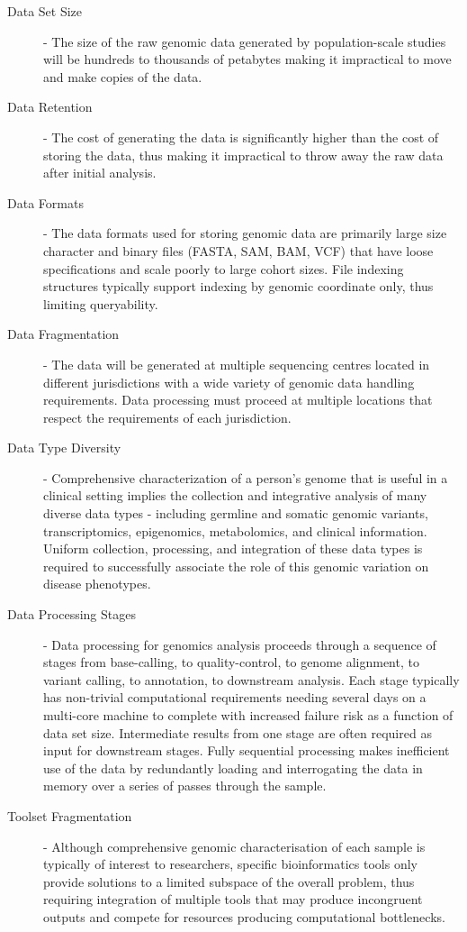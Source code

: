 \begin{description}
\item [Data Set Size] - The size of the raw genomic data generated by population-scale studies will be hundreds to thousands of petabytes making it impractical to move and make copies of the data\autocite{stephens2015big}.
\item [Data Retention] - The cost of generating the data is significantly higher than the cost of storing the data, thus making it impractical to throw away the raw data after initial analysis\autocite{muir2016real}.
\item [Data Formats] - The data formats used for storing genomic data are primarily large size character and binary files (FASTA, SAM, BAM, VCF)\autocite{li2009sequence,danecek2011variant} that have loose specifications and  scale poorly to large cohort sizes. File indexing structures typically support indexing by genomic coordinate only, thus limiting queryability. 
\item [Data Fragmentation] - The data will be generated at multiple sequencing centres located in different jurisdictions with a wide variety of genomic data handling requirements. Data processing must proceed at multiple locations that respect the requirements of each jurisdiction\autocite{molnar2017computing}.
\item [Data Type Diversity] - Comprehensive characterization of a person's genome that is useful in a clinical setting implies the collection and integrative analysis of many diverse data types - including germline\autocite{malkin1990germ} and somatic\autocite{greenman2007patterns} genomic variants, transcriptomics\autocite{wang2009rna}, epigenomics\autocite{jones2007epigenomics}, metabolomics\autocite{vermeersch2013applications}, and clinical information. Uniform collection, processing, and integration of these data types is required to successfully associate the role of this genomic variation on disease phenotypes\autocite{robinson2015integrative}.
\item [Data Processing Stages] - Data processing for genomics analysis proceeds through a sequence of stages from base-calling, to quality-control, to genome alignment, to variant calling, to annotation, to downstream analysis\autocite{depristo2011framework}. Each stage typically has non-trivial computational requirements needing several days on a multi-core machine to complete with increased failure risk as a function of data set size. Intermediate results from one stage are often required as input for downstream stages. Fully sequential processing makes inefficient use of the data by redundantly loading and interrogating the data in memory over a series of passes through the sample.
\item [Toolset Fragmentation] - Although comprehensive genomic characterisation of each sample is typically of interest to researchers, specific bioinformatics tools only provide solutions to a limited subspace of the overall problem, thus requiring integration of multiple tools that may produce incongruent outputs and compete for resources producing computational bottlenecks. 
\end{description}

